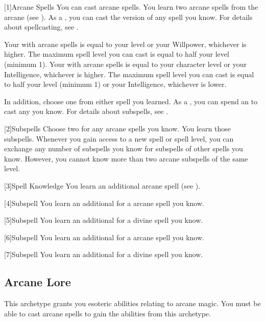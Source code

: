         [1]{Arcane Spells}
        You can cast arcane spells.
        You learn two arcane spells from the arcane  (see ).
        As a , you can cast the  version of any spell you know.
        For details about spellcasting, see .

         Your  with arcane spells is equal to your level or your Willpower, whichever is higher.
        The maximum spell level you can cast is equal to half your level (minimum 1).
         Your  with arcane spells is equal to your character level or your Intelligence, whichever is higher.
        The maximum spell level you can cast is equal to half your level (minimum 1) or your Intelligence, whichever is lower.

        In addition, choose one  from either spell you learned.
        As a , you can spend an  to cast any  you know.
        For details about subspells, see .

        [2]{Subspells} Choose two  for any arcane spells you know.
        You learn those subspells.
        Whenever you gain access to a new spell or spell level, you can exchange any number of subspells you know for subspells of other spells you know.
        However, you cannot know more than two arcane subspells of the same level.

        [3]{Spell Knowledge}
        You learn an additional arcane spell (see ).

        [4]{Subspell}
        You learn an additional  for a arcane spell you know.

        [5]{Subspell}
        You learn an additional  for a divine spell you know.

        [6]{Subspell}
        You learn an additional  for a arcane spell you know.

        [7]{Subspell}
        You learn an additional  for a divine spell you know.

    \subsection{Arcane Lore}
        This archetype grants you esoteric abilities relating to arcane magic.
        You must be able to cast arcane spells to gain the abilities from this archetype.


